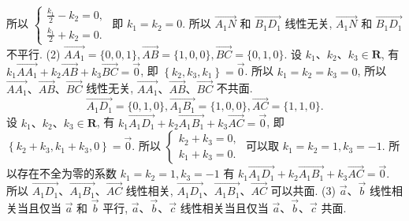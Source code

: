 所以 $\left\{\begin{array}{l}\frac{k_1}{2}-k_2=0, \\ \frac{k_1}{2}+k_2=0 .\end{array}\right.$ 即 $k_1=k_2=0$.
所以 $\overrightarrow{A_1 N}$ 和 $\overrightarrow{B_1 D_1}$ 线性无关, $\overrightarrow{A_1 N}$ 和 $\overrightarrow{B_1 D_1}$ 不平行.
(2) $\overrightarrow{A A_1}=\{0,0,1\}, \overrightarrow{A B}=\{1,0,0\}, \overrightarrow{B C}=\{0,1,0\}$.
设 $k_1 、 k_2 、 k_3 \in \mathbf{R}$, 有 $k_1 \overrightarrow{A A_1}+k_2 \overrightarrow{A B}+k_3 \overrightarrow{B C}=\overrightarrow{0}$, 即 $\left\{k_2, k_3, k_1\right\}=\overrightarrow{0}$.
所以 $k_1=k_2=k_3=0$, 所以 $\overrightarrow{A A_1} 、 \overrightarrow{A B} 、 \overrightarrow{B C}$ 线性无关, $\overrightarrow{A A_1} 、 \overrightarrow{A B} 、 \overrightarrow{B C}$ 不共面.
$$
\overrightarrow{A_1 D_1}=\{0,1,0\}, \overrightarrow{A_1 B_1}=\{1,0,0\}, \overrightarrow{A C}=\{1,1,0\} .
$$
设 $k_1 、 k_2 、 k_3 \in \mathbf{R}$, 有 $k_1 \overrightarrow{A_1 D_1}+k_2 \overrightarrow{A_1 B_1}+k_3 \overrightarrow{A C}=\overrightarrow{0}$, 即 $\left\{k_2+k_3, k_1+\right. \left.k_3, 0\right\}=\overrightarrow{0}$.
所以 $\left\{\begin{array}{l}k_2+k_3=0, \\ k_1+k_3=0 .\end{array}\right.$ 可以取 $k_1=k_2=1, k_3=-1$.
所以存在不全为零的系数 $k_1=k_2=1, k_3=-1$ 有 $k_1 \overrightarrow{A_1 D_1}+k_2 \overrightarrow{A_1 B_1}+ k_3 \overrightarrow{A C}=\overrightarrow{0}$.
所以 $\overrightarrow{A_1 D_1} 、 \overrightarrow{A_1 B_1} 、 \overrightarrow{A C}$ 线性相关, $\overrightarrow{A_1 D_1} 、 \overrightarrow{A_1 B_1} 、 \overrightarrow{A C}$ 可以共面.
(3) $\vec{a} 、 \vec{b}$ 线性相关当且仅当 $\vec{a}$ 和 $\vec{b}$ 平行, $\vec{a} 、 \vec{b} 、 \vec{c}$ 线性相关当且仅当 $\vec{a} 、 \vec{b} 、 \vec{c}$ 共面.


